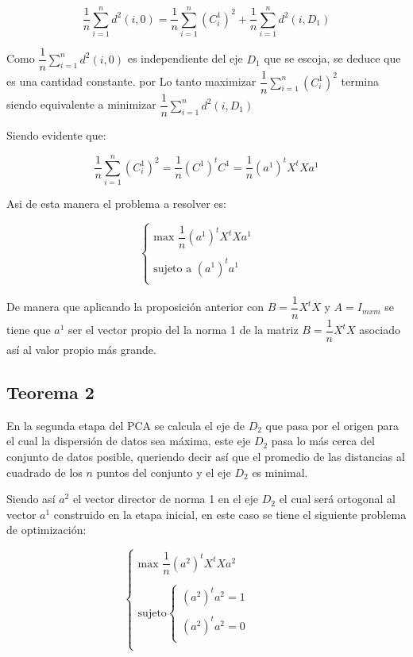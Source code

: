$$\dfrac{1}{n} \sum_{i=1}^{n}d^2(i,0)=\dfrac{1}{n}\sum_{i=1}^{n}(C_{i}^{1})^2+\dfrac{1}{n} \sum_{i=1}^{n}d^2(i,D_1)$$

Como $\dfrac{1}{n} \sum_{i=1}^{n}d^2(i,0)$ es independiente del eje $D_1$ que se escoja, se deduce que es una cantidad constante. por Lo tanto maximizar $\dfrac{1}{n}\sum_{i=1}^{n}(C_{i}^{1})^2$ termina siendo equivalente a minimizar $\dfrac{1}{n} \sum_{i=1}^{n}d^2(i,D_1)$

Siendo evidente que:

$$\dfrac{1}{n}\sum_{i=1}^{n}(C_{i}^{1})^2=\dfrac{1}{n}(C^1)^tC^1=\dfrac{1}{n}(a^1)^tX^tXa^1$$

Asi de esta manera el problema a resolver es:

\[\left\{ \begin{array}{rcl}
\mbox{max } \dfrac{1}{n} (a^1)^tX^tXa^1 \\
& & \\
\mbox{sujeto a } (a^1)^ta^1 \\
\end{array}
\right. \]

De manera que aplicando la proposición anterior con $B=\dfrac{1}{n}X^tX$ y $A=I_{mxm}$ se tiene que $a^1$ ser el vector propio del la norma 1 de la matriz $B=\dfrac{1}{n}X^tX$ asociado así al valor propio más grande.

\subsection{Teorema 2}

En la segunda etapa del PCA se calcula el eje de $D_2$ que pasa por el origen para el cual la dispersión de datos sea máxima, este eje $D_2$ pasa lo más cerca del conjunto de datos posible, queriendo decir así que el promedio de las distancias al cuadrado de los $n$ puntos del conjunto y el eje $D_2$ es minimal.

Siendo así $a^2$ el vector director de norma 1 en el eje $D_2$ el cual será ortogonal al vector $a^1$ construido en la etapa inicial, en este caso se tiene el siguiente problema de optimización:


\[\left\{ \begin{array}{rcl}
\mbox{max  } \dfrac{1}{n} (a^2)^tX^tXa^2 \\
& & \\
\mbox{sujeto}\left\{ \begin{array}{rcl}
(a^2)^ta^2=1 \\
& & \\
(a^2)^ta^2=0 \\
\end{array}
\right.  \\
\end{array}
\right. \]

